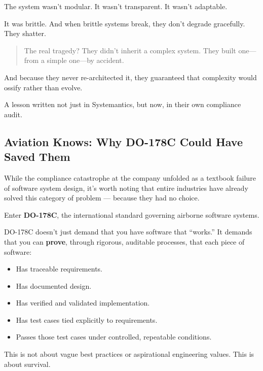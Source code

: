     The system wasn’t modular.  
    It wasn’t transparent.  
    It wasn’t adaptable.
    
    It was brittle.  
    And when brittle systems break, they don’t degrade gracefully.  
    They shatter.
    
    \medskip
    
    \begin{quote}
    The real tragedy?  
    They didn’t inherit a complex system.
    They built one—from a simple one—by accident.
    \end{quote}
    
    And because they never re-architected it, they guaranteed that complexity would ossify rather than evolve.
    
    A lesson written not just in Systemantics, but now, in their own compliance audit.
    


    \subsection{Aviation Knows: Why DO-178C Could Have Saved Them}

    While the compliance catastrophe at the company unfolded as a textbook failure of software system design, it’s worth noting that entire industries have already solved this category of problem — because they had no choice.
    
    Enter \textbf{DO-178C}, the international standard governing airborne software systems.
    
    \medskip
    
    DO-178C doesn’t just demand that you have software that “works.”  
    It demands that you can \textbf{prove}, through rigorous, auditable processes, that each piece of software:
    
    \begin{itemize}
        \item Has traceable requirements.
        \item Has documented design.
        \item Has verified and validated implementation.
        \item Has test cases tied explicitly to requirements.
        \item Passes those test cases under controlled, repeatable conditions.
    \end{itemize}
    
    This is not about vague best practices or aspirational engineering values.  
    This is about survival.
    
